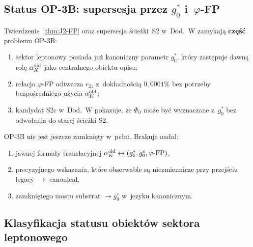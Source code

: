 \subsection{Status OP-3B: supersesja przez $g_0^*$ i~$\varphi$-FP}
\label{app:Z-OP3B}

\begin{proposition}
\label{prop:Z-OP3B-partial}
Twierdzenie~\ref{thm:J2-FP} oraz supersesja \'scie\.zki~S2
w~Dod.~W zamykaj\k{a} \textbf{cz\k{e}\'s\'c} problemu OP-3B:
\begin{enumerate}[nosep]
  \item sektor leptonowy posiada ju\.z kanoniczny parametr
    $g_0^*$, kt\'ory zast\k{e}puje dawn\k{a} rol\k{e}
    $\alpha_K^{\rm old}$ jako centralnego obiektu opisu;
  \item relacja $\varphi$-FP odtwarza $r_{21}$ z~dok\l{}adno\'sci\k{a}
    $0{,}0001\%$ bez potrzeby bezpo\'sredniego u\.zycia
    $\alpha_K^{\rm old}$;
  \item kandydat S2c w~Dod.~W pokazuje, \.ze
    $\Phi_0$ mo\.ze by\'c wyznaczane z~$g_0^*$
    bez odwo\l{}ania do starej \'scie\.zki S2.
\end{enumerate}
\end{proposition}

\begin{remark}
OP-3B nie jest jeszcze zamkni\k{e}ty w~pe\l{}ni.
Brakuje nadal:
\begin{enumerate}[nosep]
  \item jawnej formu\l{}y translacyjnej
    $\alpha_K^{\rm old}\leftrightarrow(g_0^*,g_0^e,\varphi\text{-FP})$,
  \item precyzyjnego wskazania, kt\'ore obserwable
    s\k{a} niezmiennicze przy przej\'sciu legacy $\to$ canonical,
  \item zamkni\k{e}tego mostu
    substrat $\to g_0^e$ w~jezyku kanonicznym.
\end{enumerate}
\end{remark}

\subsection{Klasyfikacja statusu obiekt\'ow sektora leptonowego}
\label{app:Z-classification}

